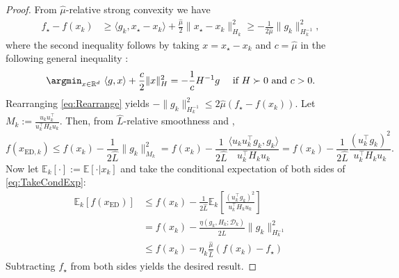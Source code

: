 \begin{proof}
    From $\hat{\mu}$-relative strong convexity we have
    \begin{align}
        f_\star - f(x_k) & \geq \langle g_k, x_\star - x_k \rangle + \frac{\hat{\mu}}{2} \| x_\star - x_k \|_{H_k}^2 \geq -\frac{1}{2\hat{\mu}} \|g_k\|_{H_k^{-1}}^2,
        \label{eq:Rearrange}
    \end{align}
    where the second inequality follows by taking $x = x_\star - x_k$ and $c = \hat{\mu}$ in the following general inequality \cite[Lemma~9]{gower2019rsn}:
    \begin{equation*}
        \argmin_{x \in \mathbb{R}^d} \,\, \langle g, x \rangle + \frac{c}{2} \|x\|_H^2 = - \frac{1}{c}H^{-1}g \quad \text{ if $H\succ 0$ and $c>0$}.
    \end{equation*}
    Rearranging \eqref{eq:Rearrange} yields
    $ - \|g_k\|_{H_k^{-1}}^2 \leq 2\hat{\mu} (f_\star - f(x_k))$.
    Let $M_k := \frac{u_k u_k^{\top}}{u_k^{\top} H_k u_k}$. Then, from $\hat{L}$-relative smoothness and \cite[Lemma~5]{gower2019rsn},
    \begin{equation}
        f(x_{\mathrm{ED}, k}) \leq  f(x_k) - \frac{1}{2\hat{L}} \|g_k\|^2_{M_k} = f(x_k) - \frac{1}{2\hat{L}} \frac{\langle u_k u_k^{\top} g_k, g_k\rangle }{u_k^\top H_k u_k}
        = f(x_k) - \frac{1}{2\hat{L}} \frac{(u_k^\top g_k)^2}{u_k^{\top} H_k u_k}.
        \label{eq:TakeCondExp}
    \end{equation}
    Now let $\mathbb{E}_k[\cdot] := \mathbb{E}[\cdot | x_k]$ and take the conditional expectation of both sides of \eqref{eq:TakeCondExp}:
    \begin{align*}
        \mathbb{E}_k\left[f(x_{\mathrm{ED}})\right]
         & \leq f(x_k) - \frac{1}{2\hat{L}} \mathbb{E}_{k}\left[  \frac{(u_{k}^\top g_k)^2}{u_{k}^{\top} H_k u_{k}} \right] \\
         & = f(x_k) - \frac{\eta(g_k, H_k; \mathcal{D}_k)}{2\hat{L}}\|g_k\|^2_{H_k^{-1}}                                    \\
         & \leq f(x_k) - \eta_{k}\frac{\hat{\mu}}{\hat{L}}(f(x_k) - f_\star)
    \end{align*}
    Subtracting $f_\star$ from both sides yields the desired result.
\end{proof}

